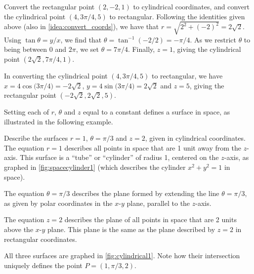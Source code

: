 

\begin{example}\label{ex_cylindrical4}%
Convert the rectangular point $(2,-2,1)$ to cylindrical coordinates, and convert the cylindrical point $(4,3\pi/4,5)$ to rectangular.
\solution
Following the identities given above (also in \autoref{idea:convert_coords}), we have that $r = \sqrt{2^2+(-2)^2} = 2\sqrt{2}$. Using $\tan\theta = y/x$, we find that $\theta = \tan^{-1}(-2/2) =-\pi/4$. As we restrict $\theta$ to being between $0$ and $2\pi$, we set $\theta = 7\pi/4$. Finally, $z = 1$, giving the cylindrical point $(2\sqrt2,7\pi/4,1)$.

In converting the cylindrical point $(4,3\pi/4,5)$ to rectangular, we have
$x = 4\cos\bigl(3\pi/4\bigr) = -2\sqrt{2}$, $y = 4\sin\bigl(3\pi/4\bigr) = 2\sqrt{2}$ and $z=5$, giving the rectangular point $(-2\sqrt{2},2\sqrt{2},5)$.
\end{example}

Setting each of $r$, $\theta$ and $z$ equal to a constant defines a surface in space, as illustrated in the following example.


\begin{example}\label{ex_cylindrical1}%
Describe the surfaces $r=1$, $\theta = \pi/3$ and $z=2$, given in cylindrical coordinates.
\solution
The equation $r=1$ describes all points in space that are 1 unit away from the $z$-axis. This surface is a ``tube'' or ``cylinder'' of radius 1, centered on the $z$-axis, as graphed in \autoref{fig:spacecylinder1} (which describes the cylinder $x^2+y^2=1$ in space). 

The equation $\theta=\pi/3$ describes the plane formed by extending the line $\theta=\pi/3$, as given by polar coordinates in the $x$-$y$ plane, parallel to the $z$-axis.

The equation $z=2$ describes the plane of all points in space that are 2 units above the $x$-$y$ plane. This plane is the same as the plane described by $z=2$ in rectangular coordinates.

All three surfaces are graphed in \autoref{fig:cylindrical1}. Note how their intersection uniquely defines the point $P=(1,\pi/3,2)$.
\end{example}

